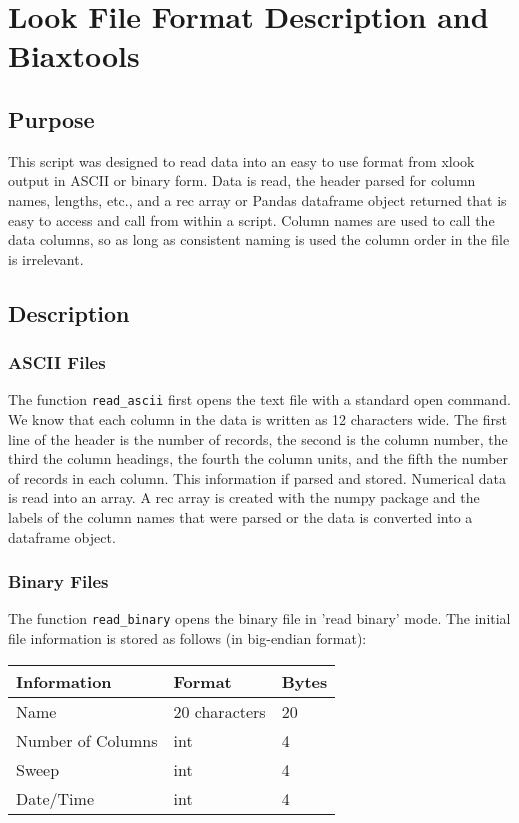 \chapter{Look File Format Description and Biaxtools}

\section{Purpose}
This script was designed to read data into an easy to use format from xlook output in ASCII or binary form.  Data is read, the header parsed for column names, lengths, etc., and a rec array or Pandas dataframe object returned that is easy to access and call from within a script.  Column names are used to call the data columns, so as long as consistent naming is used the column order in the file is irrelevant.

\section{Description}
\subsection{ASCII Files}
The function \texttt{read\_ascii} first opens the text file with a standard open command.  We know that each column in the data is written as 12 characters wide.  The first line of the header is the number of records, the second is the column number, the third the column headings, the fourth the column units, and the fifth the number of records in each column.  This information if parsed and stored.  Numerical data is read into an array.  A rec array is created with the numpy package and the labels of the column names that were parsed or the data is converted into a dataframe object. 

\subsection{Binary Files}
The function \texttt{read\_binary} opens the binary file in 'read binary' mode.  The initial file information is stored as follows (in big-endian format):


\begin{table}[h]
	\begin{center}
	\begin{tabular}{| l | l | l |}
		\hline
		Information & Format & Bytes\\
		\hline
		Name & 20 characters &  20\\
		\hline
		Number of Columns & int & 4 \\
		\hline
		Sweep & int & 4\\
		\hline
		Date/Time & int & 4\\
		\hline
	\end{tabular}
	\end{center}
	\label{BinaryFileHeadFormat}
\end{table}

